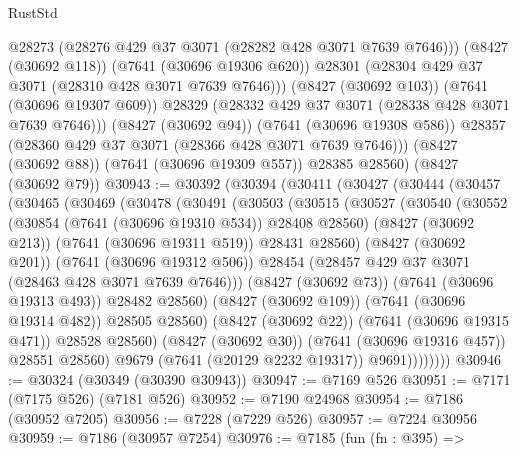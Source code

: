 \begin{lexlean}{RustStd}
\begin{coremodule}
              @28273
              (@28276 @429 @37 @3071 (@28282 @428 @3071 @7639 @7646)))
            (@8427 (@30692 @118))
            (@7641 (@30696 @19306 @620))
            @28301
            (@28304 @429 @37 @3071 (@28310 @428 @3071 @7639 @7646)))
          (@8427 (@30692 @103))
          (@7641 (@30696 @19307 @609))
          @28329
          (@28332 @429 @37 @3071 (@28338 @428 @3071 @7639 @7646)))
        (@8427 (@30692 @94))
        (@7641 (@30696 @19308 @586))
        @28357
        (@28360 @429 @37 @3071 (@28366 @428 @3071 @7639 @7646)))
      (@8427 (@30692 @88))
      (@7641 (@30696 @19309 @557))
      @28385
      @28560)
    (@8427 (@30692 @79))
@30943 := @30392
    (@30394
      (@30411
        (@30427
          (@30444
            (@30457
              (@30465
                (@30469
                  (@30478
                    (@30491
                      (@30503
                        (@30515
                          (@30527
                            (@30540
                              (@30552
                                (@30854 (@7641 (@30696 @19310 @534)) @28408 @28560)
                                (@8427 (@30692 @213))
                                (@7641 (@30696 @19311 @519))
                                @28431
                                @28560)
                              (@8427 (@30692 @201))
                              (@7641 (@30696 @19312 @506))
                              @28454
                              (@28457 @429 @37 @3071 (@28463 @428 @3071 @7639 @7646)))
                            (@8427 (@30692 @73))
                            (@7641 (@30696 @19313 @493))
                            @28482
                            @28560)
                          (@8427 (@30692 @109))
                          (@7641 (@30696 @19314 @482))
                          @28505
                          @28560)
                        (@8427 (@30692 @22))
                        (@7641 (@30696 @19315 @471))
                        @28528
                        @28560)
                      (@8427 (@30692 @30))
                      (@7641 (@30696 @19316 @457))
                      @28551
                      @28560)
                    @9679
                    (@7641 (@20129 @2232 @19317))
                    @9691))))))))
@30946 := @30324 (@30349 (@30390 @30943))
@30947 := @7169 @526
@30951 := @7171 (@7175 @526) (@7181 @526)
@30952 := @7190 @24968
@30954 := @7186 (@30952 @7205)
@30956 := @7228 (@7229 @526)
@30957 := @7224 @30956
@30959 := @7186 (@30957 @7254)
@30976 := @7185
    (fun (fn : @395) =>

\end{coremodule}
\end{lexlean}
